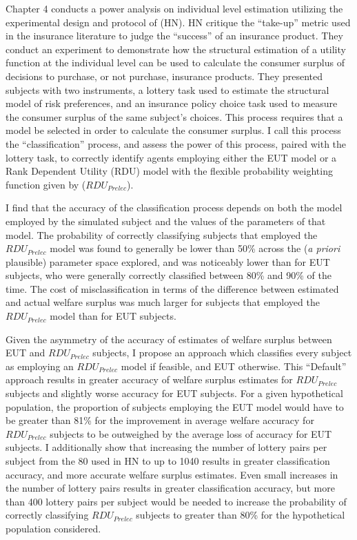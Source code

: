 \documentclass[../main.tex]{subfiles}
\begin{document}
Chapter 4 conducts a power analysis on individual level estimation utilizing the experimental design and protocol of \textcite{Harrison2016} (HN).
HN critique the \enquote{take-up} metric used in the insurance literature to judge the \enquote{success} of an insurance product.
They conduct an experiment to demonstrate how the structural estimation of a utility function at the individual level can be used to calculate the consumer surplus of decisions to purchase, or not purchase, insurance products.
They presented subjects with two instruments, a lottery task used to estimate the structural model of risk preferences, and an insurance policy choice task used to measure the consumer surplus of the same subject's choices.
This process requires that a model be selected in order to calculate the consumer surplus.
I call this process the \enquote{classification} process, and assess the power of this process, paired with the lottery task, to correctly identify agents employing either the EUT model or a Rank Dependent Utility (RDU) model with the flexible probability weighting function given by \textcite{Prelec1998} ($\mathit{RDU_{Prelec}}$).

I find that the accuracy of the classification process depends on both the model employed by the simulated subject and the values of the parameters of that model.
The probability of correctly classifying subjects that employed the $\mathit{RDU_{Prelec}}$ model was found to generally be lower than 50\% across the (\textit{a priori} plausible) parameter space explored, and was noticeably lower than for EUT subjects, who were generally correctly classified between 80\% and 90\% of the time.
The cost of misclassification in terms of the difference between estimated and actual welfare surplus was much larger for subjects that employed the $\mathit{RDU_{Prelec}}$ model than for EUT subjects.

Given the asymmetry of the accuracy of estimates of welfare surplus between EUT and $\mathit{RDU_{Prelec}}$ subjects, I propose an approach which classifies every subject as employing an $\mathit{RDU_{Prelec}}$ model if feasible, and EUT otherwise.
This \enquote{Default} approach results in greater accuracy of welfare surplus estimates for $\mathit{RDU_{Prelec}}$ subjects and slightly worse accuracy for EUT subjects.
For a given hypothetical population, the proportion of subjects employing the EUT model would have to be greater than 81\% for the improvement in average welfare accuracy for $\mathit{RDU_{Prelec}}$ subjects to be outweighed by the average loss of accuracy for EUT subjects.
I additionally show that increasing the number of lottery pairs per subject from the 80 used in HN to up to 1040 results in greater classification accuracy, and more accurate welfare surplus estimates.
Even small increases in the number of lottery pairs results in greater classification accuracy, but more than 400 lottery pairs per subject would be needed to increase the probability of correctly classifying $\mathit{RDU_{Prelec}}$ subjects to greater than 80\% for the hypothetical population considered.
\end{document}

